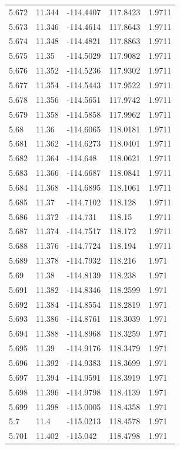 \begin{tabular}{lllll}
5.672 & 11.344 & -114.4407 & 117.8423 & 1.9711 \\
5.673 & 11.346 & -114.4614 & 117.8643 & 1.9711 \\
5.674 & 11.348 & -114.4821 & 117.8863 & 1.9711 \\
5.675 & 11.35 & -114.5029 & 117.9082 & 1.9711 \\
5.676 & 11.352 & -114.5236 & 117.9302 & 1.9711 \\
5.677 & 11.354 & -114.5443 & 117.9522 & 1.9711 \\
5.678 & 11.356 & -114.5651 & 117.9742 & 1.9711 \\
5.679 & 11.358 & -114.5858 & 117.9962 & 1.9711 \\
5.68 & 11.36 & -114.6065 & 118.0181 & 1.9711 \\
5.681 & 11.362 & -114.6273 & 118.0401 & 1.9711 \\
5.682 & 11.364 & -114.648 & 118.0621 & 1.9711 \\
5.683 & 11.366 & -114.6687 & 118.0841 & 1.9711 \\
5.684 & 11.368 & -114.6895 & 118.1061 & 1.9711 \\
5.685 & 11.37 & -114.7102 & 118.128 & 1.9711 \\
5.686 & 11.372 & -114.731 & 118.15 & 1.9711 \\
5.687 & 11.374 & -114.7517 & 118.172 & 1.9711 \\
5.688 & 11.376 & -114.7724 & 118.194 & 1.9711 \\
5.689 & 11.378 & -114.7932 & 118.216 & 1.971 \\
5.69 & 11.38 & -114.8139 & 118.238 & 1.971 \\
5.691 & 11.382 & -114.8346 & 118.2599 & 1.971 \\
5.692 & 11.384 & -114.8554 & 118.2819 & 1.971 \\
5.693 & 11.386 & -114.8761 & 118.3039 & 1.971 \\
5.694 & 11.388 & -114.8968 & 118.3259 & 1.971 \\
5.695 & 11.39 & -114.9176 & 118.3479 & 1.971 \\
5.696 & 11.392 & -114.9383 & 118.3699 & 1.971 \\
5.697 & 11.394 & -114.9591 & 118.3919 & 1.971 \\
5.698 & 11.396 & -114.9798 & 118.4139 & 1.971 \\
5.699 & 11.398 & -115.0005 & 118.4358 & 1.971 \\
5.7 & 11.4 & -115.0213 & 118.4578 & 1.971 \\
5.701 & 11.402 & -115.042 & 118.4798 & 1.971 \\

\end{tabular}
